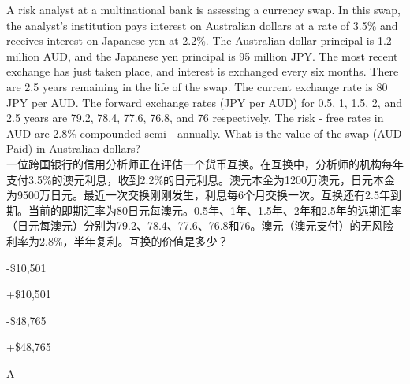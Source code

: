 \documentclass{article}
\newcounter{question} %
\begin{document}
\begin{question}
    A risk analyst at a multinational bank is assessing a currency swap. In this swap, the analyst's institution pays interest on Australian dollars at a rate of 3.5\% and receives interest on Japanese yen at 2.2\%. The Australian dollar principal is 1.2 million AUD, and the Japanese yen principal is 95 million JPY. The most recent exchange has just taken place, and interest is exchanged every six months. There are 2.5 years remaining in the life of the swap. The current exchange rate is 80 JPY per AUD. The forward exchange rates (JPY per AUD) for 0.5, 1, 1.5, 2, and 2.5 years are 79.2, 78.4, 77.6, 76.8, and 76 respectively. The risk - free rates in AUD are 2.8\% compounded semi - annually. What is the value of the swap (AUD Paid) in Australian dollars?
    \\一位跨国银行的信用分析师正在评估一个货币互换。在互换中，分析师的机构每年支付3.5\%的澳元利息，收到2.2\%的日元利息。澳元本金为1200万澳元，日元本金为9500万日元。最近一次交换刚刚发生，利息每6个月交换一次。互换还有2.5年到期。当前的即期汇率为80日元每澳元。0.5年、1年、1.5年、2年和2.5年的远期汇率（日元每澳元）分别为79.2、78.4、77.6、76.8和76。澳元（澳元支付）的无风险利率为2.8\%，半年复利。互换的价值是多少？
    \end{question}
    
    \begin{choices}
        \item -\$10,501
        \item +\$10,501
        \item -\$48,765
        \item +\$48,765
    \end{choices}
    
    \begin{correctanswer}
        A
    \end{correctanswer}
    
\end{document}
